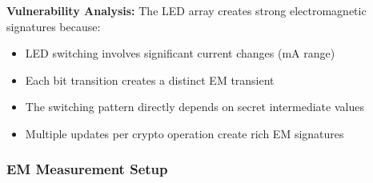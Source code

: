 \documentclass[11pt,a4paper]{article}
\theoremstyle{definition}
\begin{document}
\textbf{Vulnerability Analysis:} The LED array creates strong electromagnetic signatures because:
\begin{itemize}
    \item LED switching involves significant current changes (mA range)
    \item Each bit transition creates a distinct EM transient
    \item The switching pattern directly depends on secret intermediate values
    \item Multiple updates per crypto operation create rich EM signatures
\end{itemize}

\subsubsection{EM Measurement Setup}
\end{document}
